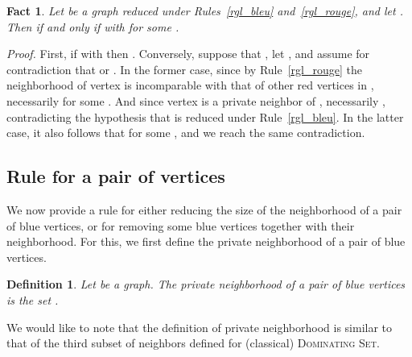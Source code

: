 \documentclass[a4paper,11pt]{article}
\newtheorem{fait} {Fact}
\newtheorem{defi} {Definition}
\newcommand{\dom}    [0] {\textsc{Dominating Set}\xspace}
\newenvironment{proof}{\noindent \textit{Proof. }}{\hfill\vspace{.2cm}}
\begin{document}
\begin{fait}
Let   be a graph reduced under Rules~\ref{rgl_bleu} and~\ref{rgl_rouge}, and let . Then  if and only if  with  for some .
\end{fait}

\begin{proof}
First, if  with  then . Conversely, suppose that , let ,  and assume for contradiction that   or . In the former case,  since by Rule~\ref{rgl_rouge} the neighborhood of vertex  is incomparable  with that of other red vertices in , necessarily  for some . And since vertex  is a private neighbor of , necessarily , contradicting the hypothesis that  is reduced under Rule~\ref{rgl_bleu}. In the latter case, it also follows that  for some , and we reach the same contradiction. \end{proof}

\subsection{Rule for a pair of vertices} \label{Rpair}

We now provide a rule for either reducing the size of the neighborhood of a pair of blue vertices, or for removing some blue vertices together with their neighborhood. For this, we first define the private neighborhood of a pair of blue vertices.

\begin{defi}
Let  be a graph. The \emph{private neighborhood} of a pair of blue vertices  is the set .
\end{defi}

We would like to note that the definition of private neighborhood is similar to that of the third subset of neighbors defined for (classical) \dom \cite{AFN04}.
\end{document}

